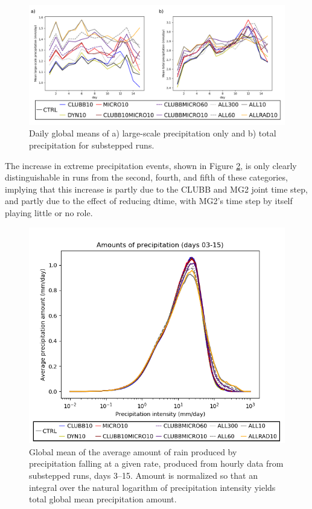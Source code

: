 \documentclass [11pt, proquest] {uwthesis}[2020/02/24]
\begin{document}
\begin{figure}
    \centering
    \includegraphics[width=6.5in]{Figure7.png}
    \caption[Rates of large-scale and total precipitation over time for short EAMv1 runs using different forms of substepping]{Daily global means of a) large-scale precipitation only and b) total precipitation for substepped runs.}
    \label{fig:precl-prect}
\end{figure}

The increase in extreme precipitation events, shown in Figure \ref{fig:prec-intensity}, is only clearly distinguishable in runs from the second, fourth, and fifth of these categories, implying that this increase is partly due to the CLUBB and MG2 joint time step, and partly due to the effect of reducing dtime, with MG2's time step by itself playing little or no role.

\begin{figure}
    \centering
    \includegraphics[width=6.5in]{PRECT_amount_d03-d15_legend.png}
    \caption[Comparison between short EAMv1 runs with different substepping, of amount of precipitation falling as a function of intensity of precipitation events]{Global mean of the average amount of rain produced by precipitation falling at a given rate, produced from hourly data from substepped runs, days 3--15. Amount is normalized so that an integral over the natural logarithm of precipitation intensity yields total global mean precipitation amount.}
    \label{fig:prec-intensity}
\end{figure}
\end{document}
